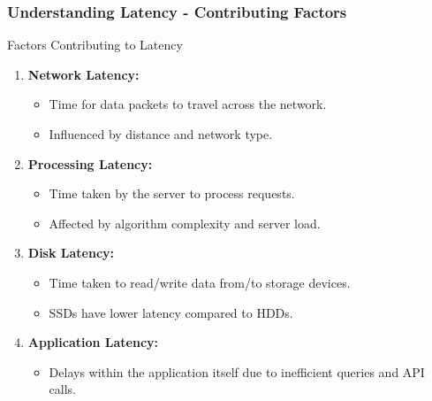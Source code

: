 \documentclass[aspectratio=169]{beamer}
\begin{document}
\begin{frame}[fragile]
    \frametitle{Understanding Latency - Contributing Factors}
    \begin{block}{Factors Contributing to Latency}
        \begin{enumerate}
            \item \textbf{Network Latency:}
                \begin{itemize}
                    \item Time for data packets to travel across the network.
                    \item Influenced by distance and network type.
                \end{itemize}
            \item \textbf{Processing Latency:}
                \begin{itemize}
                    \item Time taken by the server to process requests.
                    \item Affected by algorithm complexity and server load.
                \end{itemize}
            \item \textbf{Disk Latency:}
                \begin{itemize}
                    \item Time taken to read/write data from/to storage devices.
                    \item SSDs have lower latency compared to HDDs.
                \end{itemize}
            \item \textbf{Application Latency:}
                \begin{itemize}
                    \item Delays within the application itself due to inefficient queries and API calls.
                \end{itemize}
        \end{enumerate}
    \end{block}
\end{frame}
\end{document}
